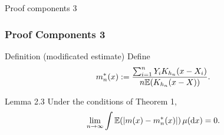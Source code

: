 \begin{frame}{Proof components 3}

    \begin{center}
    \end{center}

\end{frame}

\begin{frame}
\frametitle{Proof Components 3}

\begin{block}{Definition (modificated estimate)}
Define \[m_n^*(x) := \frac{\sum_{i=1}^{n} Y_i K_{h_n}(x-X_i)}{n \mathbb{E}\!\left(K_{h_n}(x-X)\right)}. \]  
\end{block}
\begin{block}{Lemma 2.3}
Under the conditions of Theorem 1,
\[\lim_{n\to\infty} \int \mathbb{E}\!\left(|m(x) - m_n^*(x)|\right) \mu(\mathop{}\!\mathrm{d}{x}) = 0.\]
\end{block}
\end{frame}

